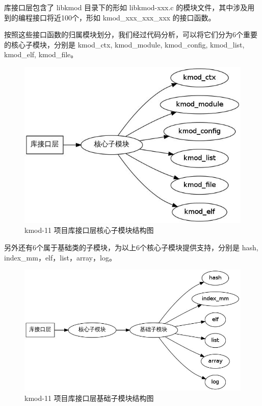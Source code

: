 \documentclass[11pt,a4paper]{article}
\makeatletter
\def\maxwidth{\ifdim\Gin@nat@width>\linewidth\linewidth
\else\Gin@nat@width\fi}
\let\Oldincludegraphics\includegraphics
\renewcommand{\includegraphics}[1]{\Oldincludegraphics[width=\maxwidth]{#1}}
\makeatother
\begin{document}
库接口层包含了 libkmod 目录下的形如 libkmod-xxx.c
的模块文件，其中涉及用到的编程接口将近100个，形如 kmod\_xxx\_xxx\_xxx
的接口函数。

按照这些接口函数的归属模块划分，我们经过代码分析，可以将它们分为6个重要的核心子模块，分别是
kmod\_ctx, kmod\_module, kmod\_config, kmod\_list, kmod\_elf,
kmod\_file。

\begin{figure}[htbp]
\centering
\includegraphics{./figures/2-core.jpg}
\caption{kmod-11 项目库接口层核心子模块结构图}
\end{figure}

另外还有6个属于基础类的子模块，为以上6个核心子模块提供支持，分别是 hash,
index\_mm，elf，list，array，log。

\begin{figure}[htbp]
\centering
\includegraphics{./figures/2-base.jpg}
\caption{kmod-11 项目库接口层基础子模块结构图}
\end{figure}
\end{document}
